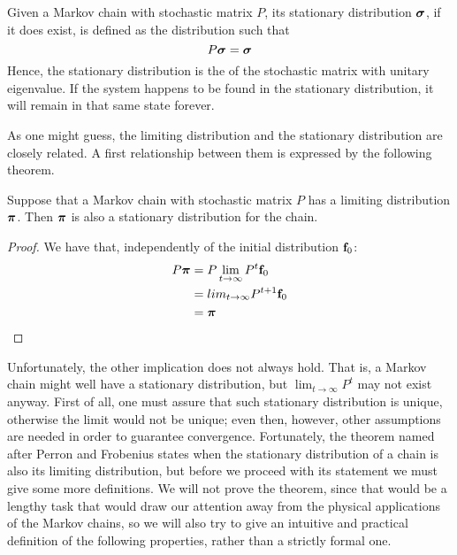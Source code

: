 \begin{ndef} 
    Given a Markov chain with stochastic matrix $P$, its stationary distribution $\boldsymbol{\sigma}$, if it does exist, is defined as the distribution such that
    \begin{equation}
        P \boldsymbol{\sigma} = \boldsymbol{\sigma}
    \end{equation}
    Hence, the stationary distribution is the  of the stochastic matrix with unitary eigenvalue. If the system happens to be found in the stationary distribution, it will remain in that same state forever.
\end{ndef}
As one might guess, the limiting distribution and the stationary distribution are closely related. A first relationship between them is expressed by the following theorem.

\begin{theorem} \label{th:limit-stat}
    Suppose that a Markov chain with stochastic matrix $P$ has a limiting distribution $\boldsymbol{\pi}$. Then $\boldsymbol{\pi}$ is also a stationary distribution for the chain.
\end{theorem}
\begin{proof}
    We have that, independently of the initial distribution $\mathbf{f}_0$:
    \begin{align}
        P \boldsymbol{\pi}
         & = P \lim_{t \rightarrow \infty} P^t \mathbf{f}_0  \\
         & = lim_{t \rightarrow \infty} P^{t+1} \mathbf{f}_0 \\
         & = \boldsymbol{\pi}
    \end{align}
\end{proof}
Unfortunately, the other implication does not always hold. That is, a Markov chain might well have a stationary distribution, but $\lim_{t \rightarrow \infty} P^t$ may not exist anyway. First of all, one must assure that such stationary distribution is unique, otherwise the limit would not be unique; even then, however, other assumptions are needed in order to guarantee convergence. Fortunately, the theorem named after Perron and Frobenius states when the stationary distribution of a chain is also its limiting distribution, but before we proceed with its statement we must give some more definitions. We will not prove the theorem, since that would be a lengthy task that would draw our attention away from the physical applications of the Markov chains, so we will also try to give an intuitive and practical definition of the following properties, rather than a strictly formal one.

